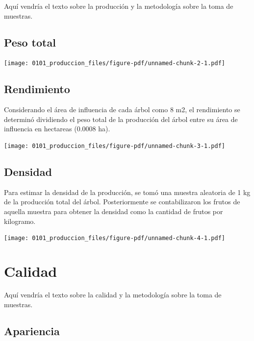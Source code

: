 \documentclass[
  letterpaper,
  DIV=11,
  numbers=noendperiod]{scrreprt}
\begin{document}
Aquí vendría el texto sobre la producción y la metodología sobre la toma
de muestras.

\section{Peso total}\label{peso-total}

\begin{center}
\texttt{[image: 0101\_produccion\_files/figure-pdf/unnamed-chunk-2-1.pdf]}
\end{center}

\section{Rendimiento}\label{rendimiento}

Considerando el área de influencia de cada árbol como 8 m2, el
rendimiento se determinó dividiendo el peso total de la producción del
árbol entre su área de influencia en hectareas (0.0008 ha).

\begin{center}
\texttt{[image: 0101\_produccion\_files/figure-pdf/unnamed-chunk-3-1.pdf]}
\end{center}

\section{Densidad}\label{densidad}

Para estimar la densidad de la producción, se tomó una muestra aleatoria
de 1 kg de la producción total del árbol. Posteriormente se
contabilizaron los frutos de aquella muestra para obtener la densidad
como la cantidad de frutos por kilogramo.

\begin{center}
\texttt{[image: 0101\_produccion\_files/figure-pdf/unnamed-chunk-4-1.pdf]}
\end{center}

\chapter{Calidad}\label{calidad}

Aquí vendría el texto sobre la calidad y la metodología sobre la toma de
muestras.

\section{Apariencia}\label{apariencia}
\end{document}
